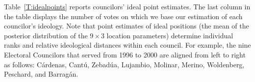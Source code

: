 \documentclass[12 pt, letter]{article}
\begin{document}


Table~\ref{T:idealpoints} reports councilors' ideal point estimates.
The last column in the table displays the number of votes on which
we base our estimation of each councilor's ideology. Note that point
estimates of ideal positions (the mean of the posterior distribution
of the $9 \times 3$ location parameters) determine individual ranks
and relative ideological distances within each council.  For
example, the nine Electoral Councilors that served from 1996 to 2000
are aligned from left to right as follows: C\'ardenas, Cant\'u,
Zebad\'ua, Lujambio, Molinar, Merino, Woldenberg, Peschard, and
Barrag\'an.
\end{document}
